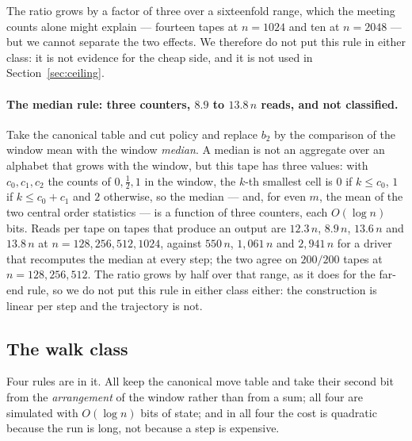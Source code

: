 \documentclass[11pt]{article}
\begin{document}
The ratio grows by a factor of three over a sixteenfold range, which the meeting counts alone
might explain --- fourteen tapes at $n=1024$ and ten at $n=2048$ --- but we cannot separate the two
effects. We therefore do not put this rule in either class: it is not evidence for the cheap side,
and it is not used in Section~\ref{sec:ceiling}.

\paragraph{The median rule: three counters, $8.9$ to $13.8\,n$ reads, and not classified.} Take the canonical table and cut
policy and replace $b_2$ by the comparison of the window mean with the window \emph{median}. A median
is not an aggregate over an alphabet that grows with the window, but this tape has three values: with
$c_0,c_1,c_2$ the counts of $0,\tfrac12,1$ in the window, the $k$-th smallest cell is $0$ if
$k\le c_0$, $1$ if $k\le c_0+c_1$ and $2$ otherwise, so the median --- and, for even $m$, the mean of
the two central order statistics --- is a function of three counters, each $O(\log n)$ bits.
Reads per tape on tapes that produce an output are $12.3\,n$, $8.9\,n$, $13.6\,n$ and $13.8\,n$ at
$n=128,256,512,1024$, against $550\,n$, $1{,}061\,n$ and $2{,}941\,n$ for a driver that recomputes the
median at every step; the two agree on $200/200$ tapes at $n=128,256,512$. The ratio grows by half over that range, as it does for the far-end rule, so we
do not put this rule in either class either: the construction is linear per step and
the trajectory is not.

\subsection{The walk class}
\label{sec:walk}

Four rules are in it. All keep the canonical move table and take their second bit from the
\emph{arrangement} of the window rather than from a sum; all four are simulated with $O(\log n)$ bits
of state; and in all four the cost is quadratic because the run is long, not because a step is
expensive.
\end{document}
